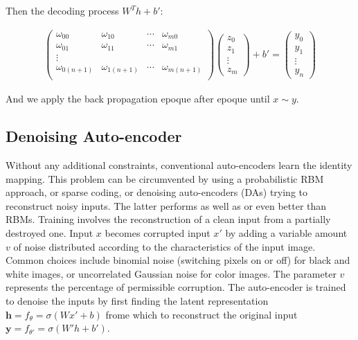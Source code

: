 \documentclass[final, paper=letter,5p,times,twocolumn]{elsarticle}
\begin{document}
Then the decoding process $W^{T}h + b'$:

\begin{eqnarray*}
  \left(
  \begin{array}{cccc}
    \omega_{00} & \omega_{10} & \cdots & \omega_{m0} \\
    \omega_{01} & \omega_{11} & \cdots & \omega_{m1} \\
    \vdots \\
    \omega_{0(n+1)} & \omega_{1(n+1)} & \cdots & \omega_{m(n+1)} \\
  \end{array}
  \right) \left(
  \begin{array}{c}
    z_{0} \\
    z_{1} \\
    \vdots \\
    z_{m} 
  \end{array}
  \right) + b' = \left(
  \begin{array}{c}
    y_{0} \\
    y_{1} \\
    \vdots \\
    y_{n} 
  \end{array}
  \right)
\end{eqnarray*}

And we apply the back propagation epoque after epoque until $x \sim y$.

\subsection{Denoising Auto-encoder}

Without any additional constraints, conventional auto-encoders learn the identity mapping. This problem can be circumvented by using a probabilistic RBM approach, or sparse coding, or denoising auto-encoders (DAs) trying to reconstruct noisy inputs. The latter performs as well as or even better than RBMs. Training involves the reconstruction of a clean input from a partially destroyed one. Input $x$ becomes corrupted input $x'$ by adding a variable amount $v$ of noise distributed according to the characteristics of the input image. Common choices include binomial noise (switching pixels on or off) for black and white images, or uncorrelated Gaussian noise for color images. The parameter $v$ represents the percentage of permissible corruption. The auto-encoder is trained to denoise the inputs by first finding the latent representation $\bm{h} = f_{\theta} = \sigma(Wx' + b)$ frome which to reconstruct the original input $\bm{y} = f_{\theta'} = \sigma( W'h + b')$.
\end{document}

